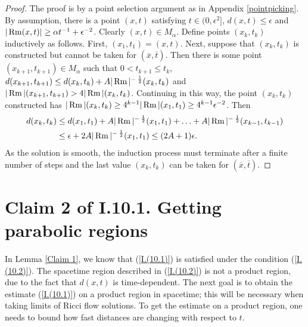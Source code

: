 \begin{proof}
The proof is by a point selection argument as in
Appendix \ref{pointpicking}. By assumption, there is a point $(x,t)$
satisfying $t \in (0, \epsilon^2]$,
$d(x, t) \le \epsilon$ and
$|\operatorname{Rm}(x, t)| \ge \alpha t^{-1} + \epsilon^{-2}$.
Clearly $(x,t) \in M_\alpha$. Define points
$(x_k, t_k)$ inductively as follows. First, $(x_1, t_1) = (x, t)$. Next,
suppose that $(x_k, t_k)$ is constructed but cannot be taken for
$(\overline{x}, \overline{t})$. Then there is some point
$(x_{k+1}, t_{k+1}) \in M_\alpha$ such that $0 < t_{k+1} \le t_k$,
$d(x_{k+1}, t_{k+1}) \le d(x_k, t_k) + A |\operatorname{Rm}|^{- \: \frac12}(x_k,t_k)$ and
$|\operatorname{Rm}|(x_{k+1},t_{k+1}) > 4|\operatorname{Rm}|(x_k, t_k)$. Continuing in this way,
the point $(x_k, t_k)$ constructed has
$|\operatorname{Rm}|(x_k, t_k) \ge 4^{k-1} |\operatorname{Rm}|(x_1, t_1) \ge 4^{k-1} \epsilon^{-2}$.
Then
\begin{align}
d(x_k, t_k) & \le d(x_1, t_1) + A |\operatorname{Rm}|^{- \: \frac12}(x_1, t_1) + \ldots
+ A |\operatorname{Rm}|^{- \: \frac12}(x_{k-1}, t_{k-1}) \\
& \le \epsilon + 2A
|\operatorname{Rm}|^{- \: \frac12}(x_1, t_1) \le (2A+1) \epsilon. \notag
\end{align}
As the solution is smooth, the induction process must terminate after a
finite number of steps and the last value $(x_k, t_k)$ can be taken
for $(\overline{x}, \overline{t})$.
\end{proof}

\section{Claim 2 of I.10.1. Getting parabolic regions}

In Lemma \ref{Claim 1}, we know that (\ref{I.(10.1)}) is satisfied under the
condition (\ref{I.(10.2)}). The spacetime region described in (\ref{I.(10.2)})
is
not a product region, due to the fact that $d(x, t)$ is time-dependent.
The next goal is to obtain the estimate (\ref{I.(10.1)}) on a product region in
spacetime; this will be necessary when taking limits of Ricci flow solutions.
To get the estimate on a product region, one needs to bound
how fast distances are changing with respect to $t$.

